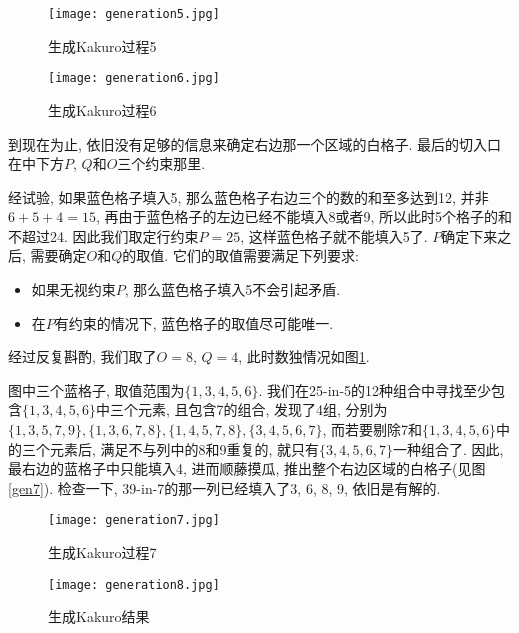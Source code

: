             \begin{figure}[htb]
                \begin{minipage}[t]{0.49\linewidth}
                    \centering
                    \texttt{[image: generation5.jpg]}
                    \caption[生成5]{生成Kakuro过程5}\label{gen5}
                \end{minipage}
                \begin{minipage}[t]{0.49\linewidth}
                    \centering
                    \texttt{[image: generation6.jpg]}
                    \caption[生成6]{生成Kakuro过程6}\label{gen6}
                \end{minipage}
            \end{figure}

            到现在为止, 依旧没有足够的信息来确定右边那一个区域的白格子.
            最后的切入口在中下方$P$, $Q$和$O$三个约束那里.

            经试验, 如果蓝色格子填入5, 那么蓝色格子右边三个的数的和至多达到12,
            并非$6+5+4=15$, 再由于蓝色格子的左边已经不能填入8或者9,
            所以此时5个格子的和不超过24.
            因此我们取定行约束$P=25$, 这样蓝色格子就不能填入5了.
            $P$确定下来之后, 需要确定$O$和$Q$的取值.
            它们的取值需要满足下列要求:
            \begin{itemize}
                \item 如果无视约束$P$, 那么蓝色格子填入5不会引起矛盾.
                \item 在$P$有约束的情况下, 蓝色格子的取值尽可能唯一.
            \end{itemize}
            经过反复斟酌, 我们取了$O=8$, $Q=4$, 此时数独情况如图\ref{gen6}.

            图中三个蓝格子, 取值范围为$\{1,3,4,5,6\}$.
            我们在25-in-5的12种组合中寻找至少包含$\{1,3,4,5,6\}$中三个元素, 且包含7的组合,
            发现了4组, 分别为$\{1,3,5,7,9\},\{1,3,6,7,8\},\{1,4,5,7,8\},\{3,4,5,6,7\}$,
            而若要剔除7和$\{1,3,4,5,6\}$中的三个元素后, 满足不与列中的8和9重复的,
            就只有$\{3,4,5,6,7\}$一种组合了.
            因此, 最右边的蓝格子中只能填入4, 进而顺藤摸瓜, 推出整个右边区域的白格子(见图\ref{gen7}).
            检查一下, 39-in-7的那一列已经填入了3, 6, 8, 9, 依旧是有解的.

             \begin{figure}[htb]
                \begin{minipage}[t]{0.49\linewidth}
                    \centering
                    \texttt{[image: generation7.jpg]}
                    \caption[生成7]{生成Kakuro过程7}\label{gen7}
                \end{minipage}
                \begin{minipage}[t]{0.49\linewidth}
                    \centering
                    \texttt{[image: generation8.jpg]}
                    \caption[生成8]{生成Kakuro结果}\label{gen8}
                \end{minipage}
            \end{figure}

